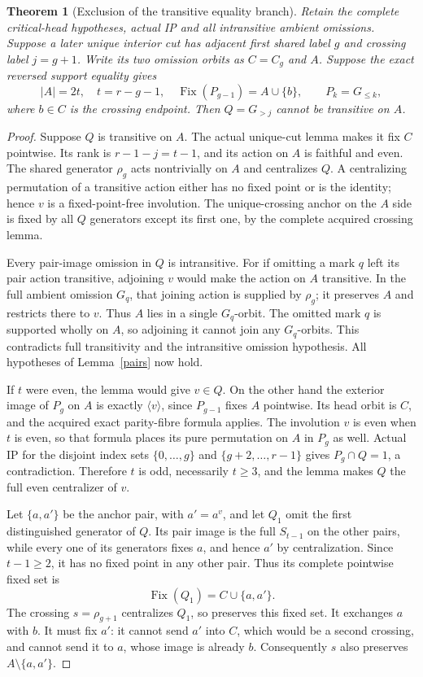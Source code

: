\documentclass[11pt,a4paper]{article}
\newtheorem{theorem}[lemma]{Theorem}
\newcommand{\gen}[1]{\langle#1\rangle}
\begin{document}
\begin{theorem}[Exclusion of the transitive equality branch]
Retain the complete critical-head hypotheses, actual IP and all
intransitive ambient omissions. Suppose a later unique interior
cut has adjacent first shared label $g$ and crossing label
$j=g+1$. Write its two omission orbits as $C=C_g$ and $A$.
Suppose the exact reversed support equality gives
\[
 |A|=2t,\quad t=r-g-1,\quad
 \operatorname{Fix}(P_{g-1})=A\cup\{b\},
 \qquad P_k=G_{\le k},
\]
where $b\in C$ is the crossing endpoint. Then $Q=G_{>j}$
cannot be transitive on $A$.
\end{theorem}
\begin{proof}
Suppose $Q$ is transitive on $A$. The actual unique-cut lemma
makes it fix $C$ pointwise.
Its rank is $r-1-j=t-1$, and its action on $A$ is faithful
and even. The shared generator $\rho_g$ acts nontrivially
on $A$ and centralizes $Q$. A centralizing permutation of
a transitive action either has no fixed point or is the
identity; hence $v$ is a fixed-point-free involution.
The unique-crossing anchor on the $A$ side is fixed by all
$Q$ generators except its first one, by the complete acquired
crossing lemma.

Every pair-image omission in $Q$ is intransitive. For if
omitting a mark $q$ left its pair action transitive, adjoining
$v$ would make the action on $A$ transitive. In the full
ambient omission $G_q$, that joining action is supplied by
$\rho_g$; it preserves $A$ and restricts there to $v$.
Thus $A$ lies in a single $G_q$-orbit. The omitted mark $q$
is supported wholly on $A$, so adjoining it cannot join any
$G_q$-orbits. This contradicts full transitivity and the
intransitive omission hypothesis. All hypotheses of
Lemma~\ref{pairs} now hold.

If $t$ were even, the lemma would give $v\in Q$. On the other
hand the exterior image of $P_g$ on $A$ is exactly $\gen v$,
since $P_{g-1}$ fixes $A$ pointwise. Its head orbit is $C$,
and the acquired exact parity-fibre formula applies.
The involution $v$ is even when $t$ is even, so that formula
places its pure permutation on $A$ in $P_g$ as well.
Actual IP for the disjoint index sets $\{0,\ldots,g\}$ and
$\{g+2,\ldots,r-1\}$ gives $P_g\cap Q=1$, a contradiction.
Therefore $t$ is odd, necessarily $t\ge3$, and the lemma
makes $Q$ the full even centralizer of $v$.

Let $\{a,a'\}$ be the anchor pair, with $a'=a^v$, and
let $Q_1$ omit the first distinguished generator of $Q$.
Its pair image is the full $S_{t-1}$ on the other pairs,
while every one of its generators fixes $a$, and hence $a'$
by centralization. Since $t-1\ge2$, it has no fixed point
in any other pair. Thus its complete pointwise fixed set is
\[
                      \operatorname{Fix}(Q_1)=C\cup\{a,a'\}.
\]
The crossing $s=\rho_{g+1}$ centralizes $Q_1$, so preserves
this fixed set. It exchanges $a$ with $b$. It must fix $a'$:
it cannot send $a'$ into $C$, which would be a second crossing,
and cannot send it to $a$, whose image is already $b$.
Consequently $s$ also preserves $A\setminus\{a,a'\}$.


\end{proof}
\end{document}
